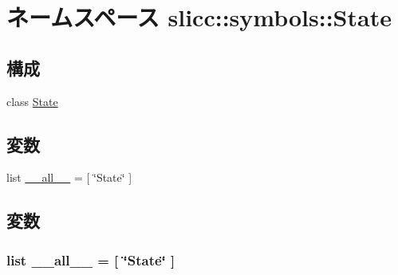 \hypertarget{namespaceslicc_1_1symbols_1_1State}{
\section{ネームスペース slicc::symbols::State}
\label{namespaceslicc_1_1symbols_1_1State}
}
\subsection*{構成}
\begin{DoxyCompactItemize}
\item 
class \hyperlink{classslicc_1_1symbols_1_1State_1_1State}{State}
\end{DoxyCompactItemize}
\subsection*{変数}
\begin{DoxyCompactItemize}
\item 
list \hyperlink{namespaceslicc_1_1symbols_1_1State_aa4a022e6ddacd362b83964da5cc5d044}{\_\-\_\-all\_\-\_\-} = \mbox{[} \char`\"{}State\char`\"{} \mbox{]}
\end{DoxyCompactItemize}


\subsection{変数}
\hypertarget{namespaceslicc_1_1symbols_1_1State_aa4a022e6ddacd362b83964da5cc5d044}{
\subsubsection[{\_\-\_\-all\_\-\_\-}]{\setlength{\rightskip}{0pt plus 5cm}list {\bf \_\-\_\-all\_\-\_\-} = \mbox{[} \char`\"{}State\char`\"{} \mbox{]}}}
\label{namespaceslicc_1_1symbols_1_1State_aa4a022e6ddacd362b83964da5cc5d044}
